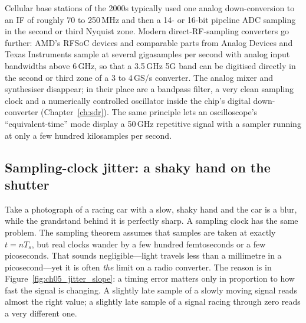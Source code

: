 \begin{inpractice}
Cellular base stations of the 2000s typically used one analog down-conversion to an IF of
roughly 70 to 250\,MHz and then a 14- or 16-bit pipeline ADC sampling in the second or third
Nyquist zone. Modern direct-RF-sampling converters go further: AMD's RFSoC devices and
comparable parts from Analog Devices and Texas Instruments sample at several gigasamples per
second with analog input bandwidths above 6\,GHz, so that a 3.5\,GHz 5G band can be digitised
directly in the second or third zone of a 3 to 4\,GS/s converter. The analog mixer and
synthesiser disappear; in their place are a bandpass filter, a very clean sampling clock
and a numerically controlled oscillator inside the chip's digital down-converter
(Chapter~\ref{ch:sdr}). The same principle lets an oscilloscope's ``equivalent-time'' mode
display a 50\,GHz repetitive signal with a sampler running at only a few hundred kilosamples per
second.
\end{inpractice}


\subsection{Sampling-clock jitter: a shaky hand on the shutter}
\label{sec:ch05:jitter}

Take a photograph of a racing car with a slow, shaky hand and the car is a blur, while the
grandstand behind it is perfectly sharp. A sampling clock has the same problem. The sampling
theorem assumes that samples are taken at exactly $t=nT_s$, but real clocks wander by a few
hundred femtoseconds or a few picoseconds. That sounds negligible---light travels less than a
millimetre in a picosecond---yet it is often \emph{the} limit on a radio converter. The reason is
in Figure~\ref{fig:ch05_jitter_slope}: a timing error matters only in proportion to how fast the
signal is changing. A slightly late sample of a slowly moving signal reads almost the right value;
a slightly late sample of a signal racing through zero reads a very different one.

